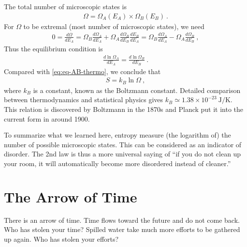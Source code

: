 {    The total number of microscopic states is
    \begin{align}
        \Omega = \Omega_A(E_A) \times \Omega_B(E_B)~.
    \end{align}
    For $\Omega$ to be extremal (most number of microscopic states), we need
    \begin{align}
        0 
        = \frac{d\Omega}{dE_A}  
        = \Omega_B \frac{d\Omega_A}{dE_A} 
        + \Omega_A \frac{d\Omega_B}{dE_B} \frac{dE_B}{dE_A}
        = \Omega_B \frac{d\Omega_A}{dE_A} 
        - \Omega_A \frac{d\Omega_B}{dE_B}~,
    \end{align}
    Thus the equilibrium condition is
    \begin{align}
        \frac{d\ln \Omega_A}{dE_A} = \frac{d\ln \Omega_B}{dE_B}~. 
    \end{align}
    Compared with \eqref{eq:eq-AB-thermo}, we conclude that
    \begin{align}
        S = k_B \ln \Omega~,
    \end{align}
    where $k_B$ is a constant, known as the Boltzmann constant. 
    Detailed comparison between thermodynamics and statistical physics gives $k_B \simeq 1.38 \times 10^{-23} ~ \mbox{J}/\mbox{K}$. This relation is discovered by Boltzmann in the 1870s and Planck put it into the current form in around 1900.

    \tcblower

    To summarize what we learned here, entropy measure (the logarithm of) the number of possible microscopic states. 
    This can be considered as an indicator of disorder. The 2nd law is thus a more universal saying of ``if you do not clean up your room, it will automatically become more disordered instead of cleaner.''
}

\section{The Arrow of Time}

There is an arrow of time. Time flows toward the future and do not come back. Who has stolen your time? Spilled water take much more efforts to be gathered up again. Who has stolen your efforts?

